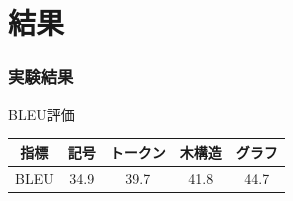 \documentclass[dvipdfmx]{beamer}
\begin{document}
\section{結果}
\begin{frame}
\frametitle{実験結果}
\begin{block}{BLEU評価}
  \label{table:evaluation}
  \centering
  \begin{tabular}{ccccc}
    \hline
    指標  & 記号 & トークン & 木構造 & グラフ \\
    \hline \hline
    BLEU  & 34.9   & 39.7 & 41.8  & 44.7\\
    \hline
  \end{tabular}
\label{sec:result}
\end{block}
\end{frame}
\end{document}
